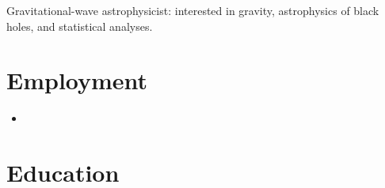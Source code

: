 \documentclass[11pt,a4paper,sans]{moderncv}        %
\begin{document}
	\makecvtitle 
	\vspace{-20pt}
		Gravitational-wave astrophysicist: interested in gravity, astrophysics of black holes, and statistical analyses.

	\section{Employment}

\vspace{4pt}
	
	
\begin{itemize}
	\item{}
	
	\end{itemize}
\vspace{2pt}
	
	\section{Education}
	
	\vspace{4pt}
	
\end{document}
